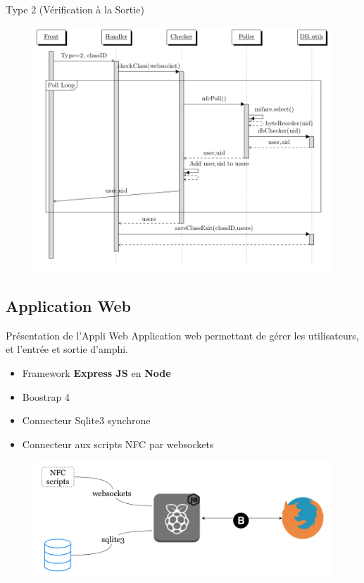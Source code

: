\documentclass[aspectratio=169]{beamer}
\begin{document}
\begin{frame}{Type 2 (Vérification à la Sortie)}
  \begin{figure}[]
    \includegraphics[height=.9\textheight]{../assets/nfcSeqExit.png}
  \end{figure}
\end{frame}

\subsection{Application Web}

\begin{frame}{Présentation de l'Appli Web}
  Application web permettant de gérer les utilisateurs, et l'entrée et sortie d'amphi.
  \begin{itemize}
    \item Framework \textbf{Express JS} en \textbf{Node}
    \item Boostrap 4
    \item Connecteur Sqlite3 synchrone
    \item Connecteur aux scripts NFC par websockets
  \end{itemize}

  \begin{figure}
    \centering
    \includegraphics[width=.5\textwidth]{../assets/web_architecture.png}
  \end{figure}
\end{frame}
\end{document}
